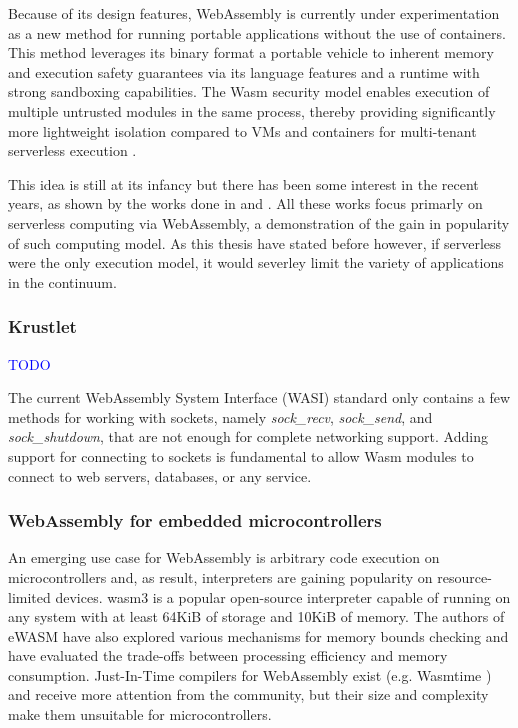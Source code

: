 Because of its design features, WebAssembly is currently under experimentation as a new method for running portable applications without the use of containers. This method leverages its binary format a portable vehicle to inherent memory and execution safety guarantees via its language features and a runtime with strong sandboxing capabilities. The Wasm security model enables execution of multiple untrusted modules in the same process, thereby providing significantly more lightweight isolation compared to VMs and containers for multi-tenant serverless execution \cite{sledge}.

This idea is still at its infancy but there has been some interest in the recent years, as shown by the works done in \cite{execution-model-serverless-edge} and \cite{faasm}. All these works focus primarly on serverless computing via WebAssembly, a demonstration of the gain in popularity of such computing model. As this thesis have stated before however, if serverless were the only execution model, it would severley limit the variety of applications in the continuum.

\subsubsection{Krustlet}

\textcolor{blue}{TODO}

The current WebAssembly System Interface (WASI) standard only contains a few methods for working with sockets, namely \emph{sock\_recv}, \emph{sock\_send}, and \emph{sock\_shutdown}, that are not enough for complete networking support. Adding support for connecting to sockets is fundamental to allow Wasm modules to connect to web servers, databases, or any service.

\subsubsection{WebAssembly for embedded microcontrollers}

An emerging use case for WebAssembly is arbitrary code execution on microcontrollers and, as result, interpreters are gaining popularity on resource-limited devices. wasm3 \cite{wasm3} is a popular open-source interpreter capable of running on any system with at least 64KiB of storage and 10KiB of memory. The authors of eWASM \cite{ewasm} have also explored various mechanisms for memory bounds checking and have evaluated the trade-offs between processing efficiency and memory consumption. Just-In-Time compilers for WebAssembly exist (e.g. Wasmtime \cite{wasmtime}) and receive more attention from the community, but their size and complexity make them unsuitable for microcontrollers.

